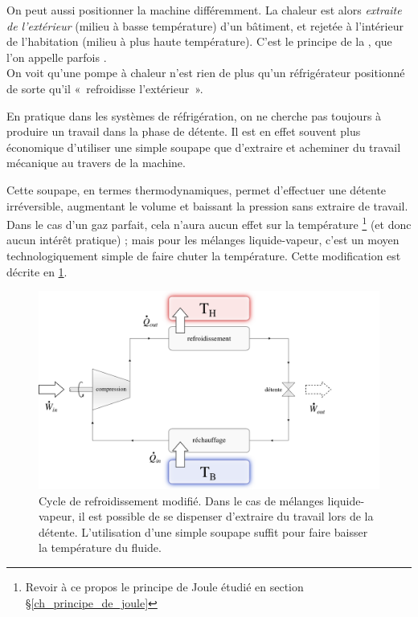 			On peut aussi positionner la machine différemment. La chaleur est alors \emph{extraite de l’extérieur} (milieu à basse température) d’un bâtiment, et rejetée à l’intérieur de l’habitation (milieu à plus haute température). C’est le principe de la , que l’on appelle parfois .\\
			On voit qu’une pompe à chaleur n’est rien de plus qu’un réfrigérateur positionné de sorte qu’il «~refroidisse l’extérieur~».

			\clearfloats
			En pratique dans les systèmes de réfrigération, on ne cherche pas toujours à produire un travail dans la phase de détente. Il est en effet souvent plus économique d’utiliser une simple soupape que d’extraire et acheminer du travail mécanique au travers de la machine.

			Cette soupape, en termes thermodynamiques, permet d’effectuer une détente irréversible, augmentant le volume et baissant la pression sans extraire de travail. Dans le cas d’un gaz parfait, cela n’aura aucun effet sur la température
				\footnote{Revoir à ce propos le principe de Joule étudié en section \S\ref{ch_principe_de_joule}}%
			(et donc aucun intérêt pratique) ; mais pour les mélanges liquide-vapeur, c’est un moyen technologiquement simple de faire chuter la température. Cette modification est décrite en \cref{fig_principe_du_réfrigérateur_soupape}.

			\begin{figure}
				\begin{center}
					\includegraphics[width=\textwidth]{images/tp_so_2.png}
				\end{center}
				\caption{Cycle de refroidissement modifié. 
			Dans le cas de mélanges liquide-vapeur, il est possible de se dispenser d’extraire du travail lors de la détente. L’utilisation d’une simple soupape suffit pour faire baisser la température du fluide.}
				\label{fig_principe_du_réfrigérateur_soupape}
			\end{figure}





